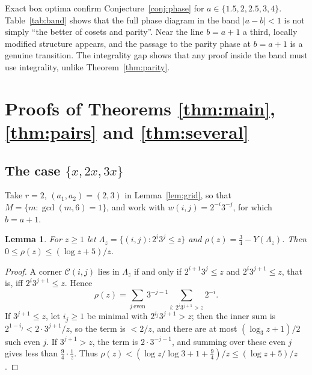 \documentclass[11pt]{amsart}
\newtheorem{lemma}[theorem]{Lemma}
\theoremstyle{definition}
\newcommand{\Cor}{\mathcal{C}}
\begin{document}
Exact box optima confirm Conjecture~\ref{conj:phase} for $a\in\{1.5,2,2.5,3,4\}$. Table~\ref{tab:band} shows that the full phase diagram in the band $|a-b|<1$ is not simply ``the better of cosets and parity''. Near the line $b=a+1$ a third, locally modified structure appears, and the passage to the parity phase at $b=a+1$ is a genuine transition. The integrality gap shows that any proof inside the band must use integrality, unlike Theorem~\ref{thm:parity}.

\section{Proofs of Theorems \ref{thm:main}, \ref{thm:pairs} and \ref{thm:several}}\label{sec:proofs}

\subsection{The case \texorpdfstring{$\{x,2x,3x\}$}{\{x,2x,3x\}}}
Take $r=2$, $(a_1,a_2)=(2,3)$ in Lemma~\ref{lem:grid}, so that $M=\{m:\gcd(m,6)=1\}$, and work with $w(i,j)=2^{-i}3^{-j}$, for which $b=a+1$.

\begin{lemma}\label{lem:rho}
For $z\ge1$ let $\Lambda_z=\{(i,j):2^i3^j\le z\}$ and $\rho(z)=\tfrac34-Y(\Lambda_z)$. Then $0\le\rho(z)\le(\log z+5)/z$.
\end{lemma}

\begin{proof}
A corner $\Cor(i,j)$ lies in $\Lambda_z$ if and only if $2^{i+1}3^j\le z$ and $2^i3^{j+1}\le z$, that is, iff $2^i3^{j+1}\le z$. Hence
\[
\rho(z)=\sum_{j\ \text{even}}3^{-j-1}\sum_{i:\,2^i3^{j+1}>z}2^{-i}.
\]
If $3^{j+1}\le z$, let $i_j\ge1$ be minimal with $2^{i_j}3^{j+1}>z$; then the inner sum is $2^{1-i_j}<2\cdot3^{j+1}/z$, so the term is $<2/z$, and there are at most $(\log_3z+1)/2$ such even $j$. If $3^{j+1}>z$, the term is $2\cdot3^{-j-1}$, and summing over these even $j$ gives less than $\tfrac94\cdot\frac1z$. Thus $\rho(z)<(\log z/\log3+1+\tfrac94)/z\le(\log z+5)/z$.
\end{proof}
\end{document}
